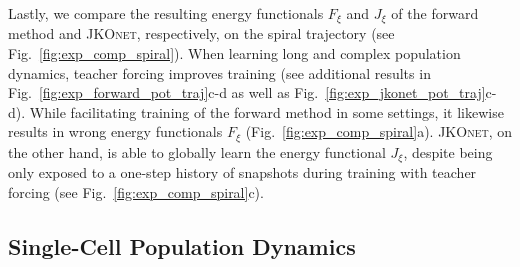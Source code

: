 Lastly, we compare the resulting energy functionals $F_\xi$ and $J_\xi$ of the forward method and \textsc{JKOnet}, respectively, on the spiral trajectory (see Fig.~\ref{fig:exp_comp_spiral}).
When learning long and complex population dynamics, teacher forcing improves training (see additional results in Fig.~\ref{fig:exp_forward_pot_traj}c-d as well as Fig.~\ref{fig:exp_jkonet_pot_traj}c-d).
While facilitating training of the forward method in some settings, it likewise results in wrong energy functionals $F_\xi$ (Fig.~\ref{fig:exp_comp_spiral}a).
\textsc{JKOnet}, on the other hand, is able to globally learn the energy functional $J_\xi$, despite being only exposed to a one-step history of snapshots during training with teacher forcing (see Fig.~\ref{fig:exp_comp_spiral}c).

\subsection{Single-Cell Population Dynamics} \label{sec:eval_cell}

